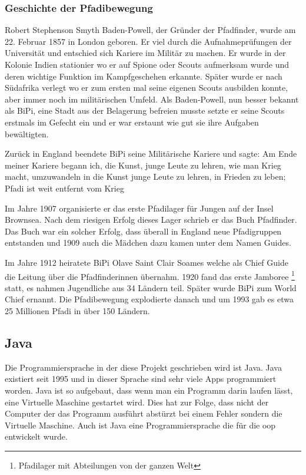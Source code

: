 \subsubsection{Geschichte der Pfadibewegung}
Robert Stephenson Smyth Baden-Powell, der Gründer der Pfadfinder, wurde am 22. Februar 1857 in London geboren. Er viel durch die Aufnahmeprüfungen der Universität und entschied sich Kariere im Militär zu machen. Er wurde in der Kolonie Indien stationier wo er auf Spione oder Scouts aufmerksam wurde und deren wichtige Funktion im Kampfgeschehen erkannte. Später wurde er nach Südafrika verlegt wo er zum ersten mal seine eigenen Scouts ausbilden konnte, aber immer noch im militärischen Umfeld. Als Baden-Powell, nun besser bekannt als BiPi, eine Stadt aus der Belagerung befreien musste setzte er seine Scouts erstmals im Gefecht ein und er war erstaunt wie gut sie ihre Aufgaben bewältigten. \par Zurück in England beendete BiPi seine Militärische Kariere und sagte: \glqq Am Ende meiner Kariere begann ich, die Kunst, junge Leute zu lehren, wie man Krieg macht, umzuwandeln in die Kunst junge Leute zu lehren, in Frieden zu leben; Pfadi ist weit entfernt vom Krieg\grqq \par
Im Jahre 1907 organisierte er das erste Pfadilager für Jungen auf der Insel Brownsea. Nach dem riesigen Erfolg dieses Lager schrieb er das Buch Pfadfinder. Das Buch war ein solcher Erfolg, dass überall in England neue Pfadigruppen entstanden und 1909 auch die Mädchen dazu kamen unter dem Namen Guides. \par Im Jahre 1912 heiratete BiPi Olave Saint Clair Soames welche als Chief Guide die Leitung über die Pfadfinderinnen übernahm. 1920 fand das erste Jamboree \footnote{Pfadilager mit Abteilungen von der ganzen Welt} statt, es nahmen Jugendliche aus 34 Ländern teil. Später wurde BiPi zum World Chief ernannt. Die Pfadibewegung explodierte danach und um 1993 gab es etwa 25 Millionen Pfadi in über 150 Ländern. 

\subsection{Java}
Die Programmiersprache in der diese Projekt geschrieben wird ist Java. Java existiert seit 1995 und in dieser Sprache sind sehr viele Apps programmiert worden\cite{noauthor_what_nodate}. Java ist so aufgebaut, dass wenn man ein Programm darin laufen lässt, eine Virtuelle Maschine gestartet wird. Dies hat zur Folge, dass nicht der Computer der das Programm ausführt abstürzt bei einem Fehler sondern die Virtuelle Maschine\cite{wikipedia-autoren_java_2024}. Auch ist Java eine Programmiersprache die für die \gls{oop} entwickelt wurde. 


